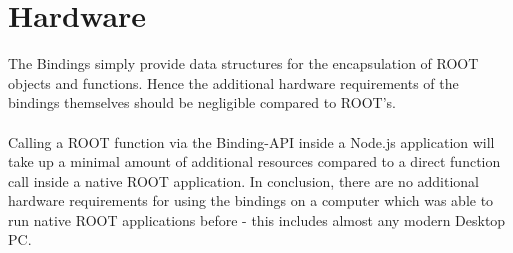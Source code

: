 \section{Hardware}

The Bindings simply provide data structures for the encapsulation of ROOT objects and functions. Hence the additional hardware requirements of the bindings themselves 
should be negligible compared to ROOT's.\\ \\
Calling a ROOT function via the Binding-API inside a Node.js application will take up a minimal amount of additional resources compared to a direct function call inside a native ROOT application.
In conclusion, there are no additional hardware requirements for using the bindings on a computer which was able to run native ROOT applications before - this includes almost any modern Desktop PC.

